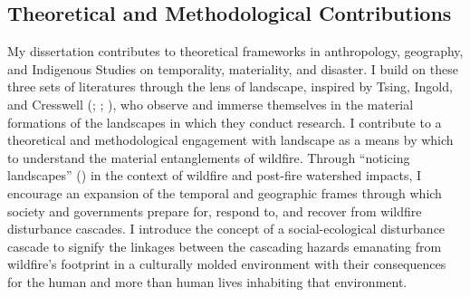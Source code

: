 \documentclass[
]{article}
\begin{document}
\subsection{Theoretical and Methodological Contributions}\label{theoretical-and-methodological-contributions}

My dissertation contributes to theoretical frameworks in anthropology, geography, and Indigenous Studies on temporality, materiality, and disaster. I build on these three sets of literatures through the lens of landscape, inspired by Tsing, Ingold, and Cresswell (; ; ), who observe and immerse themselves in the material formations of the landscapes in which they conduct research. I contribute to a theoretical and methodological engagement with landscape as a means by which to understand the material entanglements of wildfire. Through ``noticing landscapes'' () in the context of wildfire and post-fire watershed impacts, I encourage an expansion of the temporal and geographic frames through which society and governments prepare for, respond to, and recover from wildfire disturbance cascades. I introduce the concept of a social-ecological disturbance cascade to signify the linkages between the cascading hazards emanating from wildfire's footprint in a culturally molded environment with their consequences for the human and more than human lives inhabiting that environment.
\end{document}
